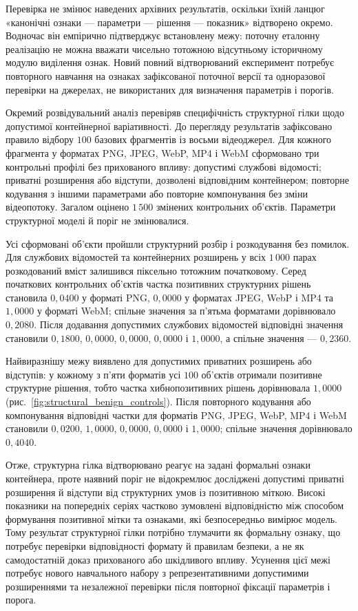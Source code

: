 Перевірка не змінює наведених архівних результатів, оскільки їхній ланцюг «канонічні ознаки --- параметри --- рішення --- показник» відтворено окремо. Водночас він емпірично підтверджує встановлену межу: поточну еталонну реалізацію не можна вважати чисельно тотожною відсутньому історичному модулю виділення ознак. Новий повний відтворюваний експеримент потребує повторного навчання на ознаках зафіксованої поточної версії та одноразової перевірки на джерелах, не використаних для визначення параметрів і порогів.

Окремий розвідувальний аналіз перевіряв специфічність структурної гілки щодо допустимої контейнерної варіативності. До перегляду результатів зафіксовано правило відбору $100$ базових фрагментів із восьми відеоджерел. Для кожного фрагмента у форматах PNG, JPEG, WebP, MP4 і WebM сформовано три контрольні профілі без прихованого впливу: допустимі службові відомості; приватні розширення або відступи, дозволені відповідним контейнером; повторне кодування з іншими параметрами або повторне компонування без зміни відеопотоку. Загалом оцінено $1\,500$ змінених контрольних об’єктів. Параметри структурної моделі й поріг не змінювалися.

Усі сформовані об’єкти пройшли структурний розбір і розкодування без помилок. Для службових відомостей та контейнерних розширень у всіх $1\,000$ парах розкодований вміст залишився піксельно тотожним початковому. Серед початкових контрольних об’єктів частка позитивних структурних рішень становила $0{,}0400$ у форматі PNG, $0{,}0000$ у форматах JPEG, WebP і MP4 та $1{,}0000$ у форматі WebM; спільне значення за п’ятьма форматами дорівнювало $0{,}2080$. Після додавання допустимих службових відомостей відповідні значення становили $0{,}1800$, $0{,}0000$, $0{,}0000$, $0{,}0000$ і $1{,}0000$, а спільне значення --- $0{,}2360$.

Найвиразнішу межу виявлено для допустимих приватних розширень або відступів: у кожному з п’яти форматів усі $100$ об’єктів отримали позитивне структурне рішення, тобто частка хибнопозитивних рішень дорівнювала $1{,}0000$ (рис.~\ref{fig:structural_benign_controls}). Після повторного кодування або компонування відповідні частки для форматів PNG, JPEG, WebP, MP4 і WebM становили $0{,}0200$, $1{,}0000$, $0{,}0000$, $0{,}0000$ і $1{,}0000$; спільне значення дорівнювало $0{,}4040$.



Отже, структурна гілка відтворювано реагує на задані формальні ознаки контейнера, проте наявний поріг не відокремлює досліджені допустимі приватні розширення й відступи від структурних умов із позитивною міткою. Високі показники на попередніх серіях частково зумовлені відповідністю між способом формування позитивної мітки та ознаками, які безпосередньо вимірює модель. Тому результат структурної гілки потрібно тлумачити як формальну ознаку, що потребує перевірки відповідності формату й правилам безпеки, а не як самодостатній доказ прихованого або шкідливого впливу. Усунення цієї межі потребує нового навчального набору з репрезентативними допустимими розширеннями та незалежної перевірки після повторної фіксації параметрів і порога.

